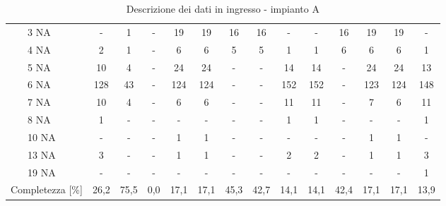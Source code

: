 \begin{sidewaystable}
\begin{center}
\begin{tabular}{|ll|c|c|c|c|c|c|c|c|c|c|c|c|c|}
		& 3 NA       & -    & 1    & -     & 19    & 19    & 16   & 16   & -      & -      & 16   & 19    & 19    & -       \\ \cline{3-15} 
		& 4 NA       & 2    & 1    & -     & 6     & 6     & 5    & 5    & 1      & 1      & 6    & 6     & 6     & 1       \\ \cline{3-15} 
		& 5 NA       & 10   & 4    & -     & 24    & 24    & -    & -    & 14     & 14     & -    & 24    & 24    & 13      \\ \cline{3-15} 
		& 6 NA       & 128  & 43   & -     & 124   & 124   & -    & -    & 152    & 152    & -    & 123   & 124   & 148     \\ \cline{3-15} 
		& 7 NA       & 10   & 4    & -     & 6     & 6     & -    & -    & 11     & 11     & -    & 7     & 6     & 11      \\ \cline{3-15} 
		& 8 NA       & 1    & -    & -     & -     & -     & -    & -    & 1      & 1      & -    & -     & -     & 1       \\ \cline{3-15} 
		& 10 NA      & -    & -    & -     & 1     & 1     & -    & -    & -      & -      & -    & 1     & 1     & -       \\ \cline{3-15} 
		& 13 NA      & 3    & -    & -     & 1     & 1     & -    & -    & 2      & 2      & -    & 1     & 1     & 3       \\ \cline{3-15} 
		& 19 NA      & -    & -    & -     & -     & -     & -    & -    & -      & -      & -    & -     & -     & 1       \\ \hline
		\multicolumn{2}{|l|}{Completezza {[}\%{]}}       & 26,2 & 75,5 & 0,0     & 17,1  & 17,1  & 45,3 & 42,7 & 14,1   & 14,1   & 42,4 & 17,1  & 17,1  & 13,9    \\ \hline
	\end{tabular}
	\caption{Descrizione dei dati in ingresso - impianto A}
	\label{tab:sa_NAin}
\end{center}
\end{sidewaystable}


